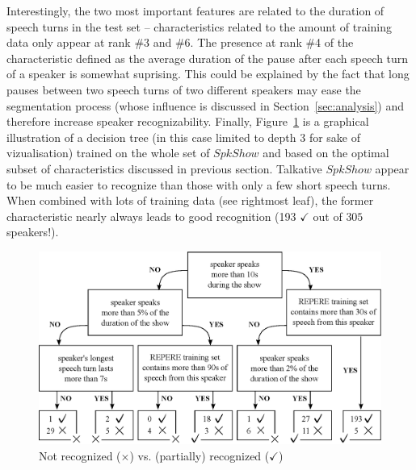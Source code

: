 Interestingly, the two most important features are related to the duration of speech turns in the test set -- characteristics related to the amount of training data only appear at rank \#3 and \#6. 
The presence at rank \#4 of the characteristic defined as the average duration of the pause after each speech turn of a speaker is somewhat suprising. This could be explained by the fact that long pauses between two speech turns of two different speakers may ease the segmentation process (whose influence is discussed in Section~\ref{sec:analysis}) and therefore increase speaker recognizability.
Finally, Figure~\ref{fig:tree} is a graphical illustration of a decision tree (in this case limited to depth 3 for sake of vizualisation) trained on the whole set of $SpkShow$ and based on the optimal subset of characteristics discussed in previous section.
Talkative $SpkShow$ appear to be much easier to recognize than those with only a few short speech turns. When combined with lots of training data (see rightmost leaf), the former characteristic nearly always leads to good recognition (193 $\checkmark$ out of $305$ speakers!). 
\begin{figure}[t]
\centering
\includegraphics[width=\linewidth]{figures/tree.eps}
\caption{Not recognized ($\times$) vs. (partially) recognized ($\checkmark$)}
\label{fig:tree}
\end{figure}



